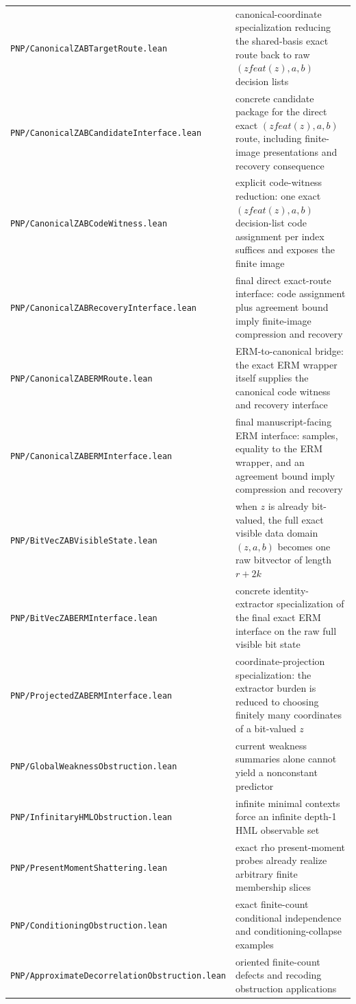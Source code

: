 \documentclass[11pt]{article}
\theoremstyle{remark}
\begin{document}
\begin{center}
\begin{tabular}{ll}
\texttt{PNP/CanonicalZABTargetRoute.lean} & canonical-coordinate specialization reducing the shared-basis exact route back to raw $(zfeat(z),a,b)$ decision lists \\
\texttt{PNP/CanonicalZABCandidateInterface.lean} & concrete candidate package for the direct exact $(zfeat(z),a,b)$ route, including finite-image presentations and recovery consequence \\
\texttt{PNP/CanonicalZABCodeWitness.lean} & explicit code-witness reduction: one exact $(zfeat(z),a,b)$ decision-list code assignment per index suffices and exposes the finite image \\
\texttt{PNP/CanonicalZABRecoveryInterface.lean} & final direct exact-route interface: code assignment plus agreement bound imply finite-image compression and recovery \\
\texttt{PNP/CanonicalZABERMRoute.lean} & ERM-to-canonical bridge: the exact ERM wrapper itself supplies the canonical code witness and recovery interface \\
\texttt{PNP/CanonicalZABERMInterface.lean} & final manuscript-facing ERM interface: samples, equality to the ERM wrapper, and an agreement bound imply compression and recovery \\
\texttt{PNP/BitVecZABVisibleState.lean} & when $z$ is already bit-valued, the full exact visible data domain $(z,a,b)$ becomes one raw bitvector of length $r+2k$ \\
\texttt{PNP/BitVecZABERMInterface.lean} & concrete identity-extractor specialization of the final exact ERM interface on the raw full visible bit state \\
\texttt{PNP/ProjectedZABERMInterface.lean} & coordinate-projection specialization: the extractor burden is reduced to choosing finitely many coordinates of a bit-valued $z$ \\
\texttt{PNP/GlobalWeaknessObstruction.lean} & current weakness summaries alone cannot yield a nonconstant predictor \\
\texttt{PNP/InfinitaryHMLObstruction.lean} & infinite minimal contexts force an infinite depth-1 HML observable set \\
\texttt{PNP/PresentMomentShattering.lean} & exact rho present-moment probes already realize arbitrary finite membership slices \\
\texttt{PNP/ConditioningObstruction.lean} & exact finite-count conditional independence and conditioning-collapse examples \\
\texttt{PNP/ApproximateDecorrelationObstruction.lean} & oriented finite-count defects and recoding obstruction applications \\

\end{tabular}
\end{center}
\end{document}
